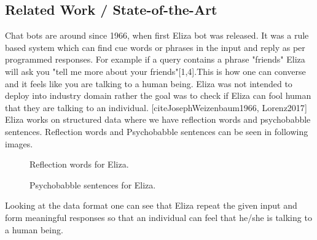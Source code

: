 \documentclass[a4paper,12pt]{article}
\begin{document}
 


\subsection{Related Work / State-of-the-Art}

Chat bots are around since 1966, when first Eliza bot was released. It was a rule based system which can find cue words or phrases in the input and reply as per programmed responses. For example if a query contains a phrase "friends" Eliza will ask you "tell me more about your friends"[1,4].This is how one can converse and it feels like you are talking to a human being. Eliza was not intended to deploy into industry domain rather the goal was to check if Eliza can fool human that they are talking to an individual. [cite{JosephWeizenbaum1966, Lorenz2017}]
Eliza works on structured data where we have reflection words and psychobabble sentences. Reflection words and Psychobabble sentences can be seen in following images. 

\begin{figure}[!tbp]
  \centering
  \begin{minipage}[b]{0.29\textwidth}
    \caption{ Reflection words for Eliza.}
  \end{minipage}
  \hfill
  \begin{minipage}[b]{0.55\textwidth}
    \caption{Psychobabble sentences for Eliza.}
    \label{fig:eliza}
  \end{minipage}

\end{figure}

Looking at the data format one can see that Eliza repeat the given input and form meaningful responses so that an individual can feel that he/she is talking to a human being. 
\end{document}
